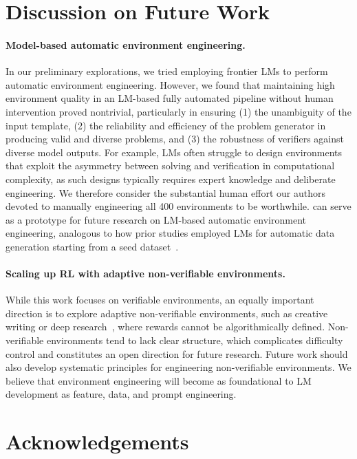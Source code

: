 \documentclass{article}
\theoremstyle{plain}
\theoremstyle{definition}
\theoremstyle{remark}
\begin{document}
\section{Discussion on Future Work}
\paragraph{Model-based automatic environment engineering.}
In our preliminary explorations, we tried employing frontier LMs to perform automatic environment engineering.
However, we found that maintaining high environment quality in an LM-based fully automated pipeline without human intervention proved nontrivial, particularly in ensuring (1) the unambiguity of the input template, (2) the reliability and efficiency of the problem generator in producing valid and diverse problems, and (3) the robustness of verifiers against diverse model outputs.
For example, LMs often struggle to design environments that exploit the asymmetry between solving and verification in computational complexity, as such designs typically requires expert knowledge and deliberate engineering.
We therefore consider the substantial human effort our authors devoted to manually engineering all 400 environments to be worthwhile.
\suite{} can serve as a prototype for future research on LM-based automatic environment engineering, analogous to how prior studies employed LMs for automatic data generation starting from a seed dataset~\citep{wang2023self-instruct}.

\paragraph{Scaling up RL with adaptive non-verifiable environments.}
While this work focuses on verifiable environments, an equally important direction is to explore adaptive non-verifiable environments, such as creative writing or deep research~\citep{openai2025deepresearch}, where rewards cannot be algorithmically defined.
Non-verifiable environments tend to lack clear structure, which complicates difficulty control and constitutes an open direction for future research.
Future work should also develop systematic principles for engineering non-verifiable environments.
We believe that environment engineering will become as foundational to LM development as feature, data, and prompt engineering.






\section*{Acknowledgements}
\end{document}
